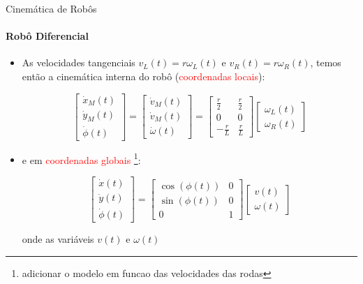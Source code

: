 \documentclass{beamer}
\begin{document}
\begin{frame}{Cinemática de Robôs}
    \framesubtitle{Robô Diferencial}
    \begin{itemize}
        \item As velocidades tangenciais $v_L(t)=r\omega_L(t)$ e $v_R(t)=r\omega_R(t)$, temos então a cinemática interna do robô (\textcolor{red}{coordenadas locais}):
        
        \begin{equation*}
            \boxed{
            \begin{bmatrix}
                \dot{x}_M(t) \\
                \dot{y}_M(t) \\
                \dot{\phi}(t)
            \end{bmatrix}
            =
            \begin{bmatrix}
                \dot{v}_M(t) \\
                \dot{v}_M(t) \\
                \dot{\omega}(t)
            \end{bmatrix}
            =
            \begin{bmatrix}
                \frac{r}{2} & \frac{r}{2}\\
                0 & 0 \\
                -\frac{r}{L} & \frac{r}{L}
            \end{bmatrix}
            \begin{bmatrix}
                \omega_L(t)\\
                \omega_R(t)
            \end{bmatrix}}
        \end{equation*}

        \item e em \textcolor{red}{coordenadas globais}
        \footnote{adicionar o modelo em funcao das velocidades das rodas}:
        
        \begin{equation*}
            \boxed{
            \begin{bmatrix}
                \dot{x}(t) \\
                \dot{y}(t) \\
                \dot{\phi}(t)
            \end{bmatrix}
            = 
            \begin{bmatrix}
                \cos(\phi(t)) & 0\\
                \sin(\phi(t)) & 0 \\
                0 & 1
            \end{bmatrix}
            \begin{bmatrix}
                v(t)\\
                \omega(t)
            \end{bmatrix}}
        \end{equation*}
        
        onde as variáveis $v(t)$ e $\omega(t)$

        
    \end{itemize}
\end{frame}
\end{document}
